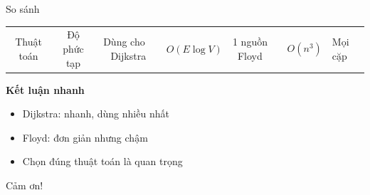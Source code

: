 \documentclass{beamer}
\begin{document}
\begin{frame}{So sánh}

\begin{tcolorbox}
\begin{tabular}{|c|c|c|}
\hline
Thuật toán & Độ phức tạp & Dùng cho \
\hline
Dijkstra & $O(E\log V)$ & 1 nguồn \
Floyd & $O(n^3)$ & Mọi cặp \
\hline
\end{tabular}
\end{tcolorbox}

\vspace{0.2cm}

\begin{tcolorbox}
\textbf{\faLightbulb Kết luận nhanh}
\begin{itemize}
\item Dijkstra: nhanh, dùng nhiều nhất
\item Floyd: đơn giản nhưng chậm
\item Chọn đúng thuật toán là quan trọng
\end{itemize}
\end{tcolorbox}

\end{frame}

\begin{frame}
\centering
\Huge{Cảm ơn!}
\end{frame}
\end{document}

